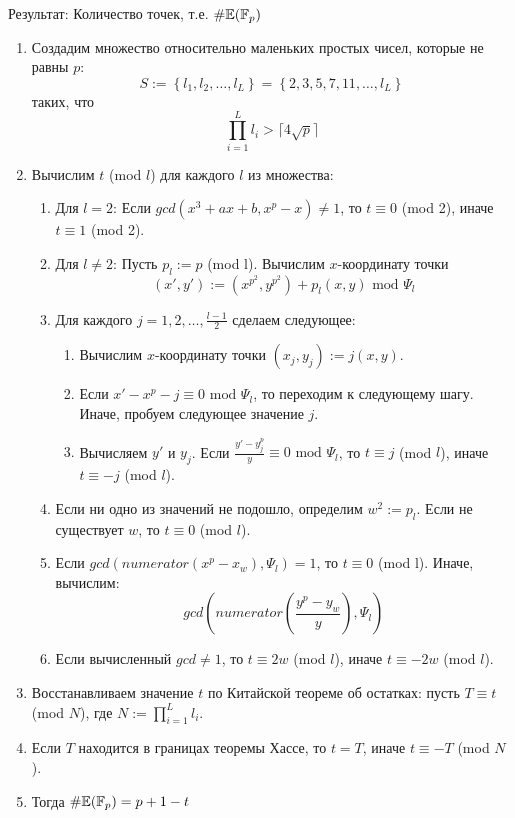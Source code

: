 \documentclass{article}
\begin{document}
    Результат: Количество точек, т.е. $\#\mathbb{E}(\mathbb{F}_p)$
    \begin{enumerate}
      \item Создадим множество относительно маленьких простых чисел, которые не равны $p$:
      \[S:= \left\{l_1,l_2,\dots,l_L\right\} = \left\{2,3,5,7,11,\dots,l_L\right\}\]
      таких, что
      \[\prod_{i=1}^Ll_i > \lceil 4 \sqrt{p}\rceil\]
      \item Вычислим $t$ (mod $l$) для каждого $l$ из множества: 
      \begin{enumerate}
      \item Для $l=2$: Если $gcd(x^3+ax+b,x^p-x)\neq 1$, то $t\equiv 0$ (mod 2), иначе $t\equiv 1$ (mod 2). 
      \item Для $l\neq 2$: Пусть $p_l := p$ (mod l). Вычислим $x$-координату точки
      \[(x',y'):=(x^{p^2},y^{p^2})+p_l(x,y)\text{ mod } \Psi_l\]
      \item Для каждого $j=1,2,\dots,\frac{l-1}{2}$ сделаем следующее:
      \begin{enumerate}
        \item Вычислим $x$-координату точки $(x_j,y_j):=j(x,y)$.
        \item Если $x' - x^p-j\equiv 0\text{ mod } \Psi_l$, то переходим к следующему шагу. Иначе, пробуем следующее значение $j$.
        \item Вычисляем $y'$ и $y_j$. Если $\frac{y' - y_j^p}{y}\equiv 0\text{ mod } \Psi_l$, то $t\equiv j$ (mod $l$), иначе $t\equiv -j$ (mod $l$). 
      \end{enumerate}
      \item Если ни одно из значений не подошло, определим $w^2:=p_l$. Если не существует $w$, то $t\equiv 0$ (mod $l$).
      \item Если $gcd(numerator(x^p-x_w),\Psi_l)=1$, то $t\equiv 0$ (mod l). Иначе, вычислим:
      \[gcd(numerator(\frac{y^p-y_w}{y}),\Psi_l)\]
      \item Если вычисленный $gcd\neq 1$, то $t\equiv 2w$ (mod $l$), иначе $t\equiv -2w$ (mod $l$). 
      \end{enumerate}
      \item Восстанавливаем значение $t$ по Китайской теореме об остатках: пусть $T\equiv t$ (mod $N$), где $N:=\prod_{i=1}^Ll_i$.
      \item Если $T$ находится в границах теоремы Хассе, то $t = T$, иначе $t\equiv -T$ (mod $N$).
      \item Тогда $\#\mathbb{E}(\mathbb{F}_p) = p + 1 - t$
    \end{enumerate}
   
\end{document}
